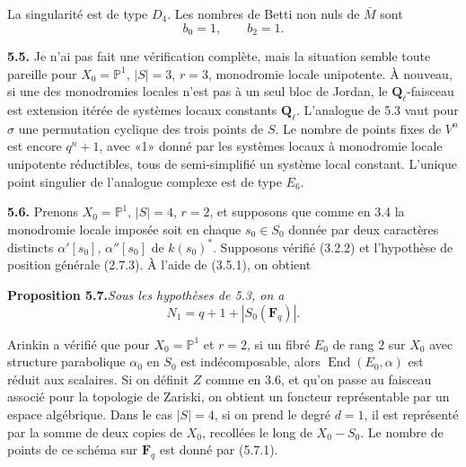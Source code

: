 \documentclass[11pt]{article}
\newcommand{\Fq}{\mathbf{F}_q}
\newcommand{\Ql}{\mathbf{Q}_{\ell}}
\newcommand{\End}{\operatorname{End}}
\newcommand{\Pone}{\mathbb{P}^{1}}
\newcommand{\para}[1]{\medskip\noindent\textbf{#1}\enspace}
\begin{document}
La singularité est de type \(D_4\). Les nombres de Betti non nuls de \(\bar M\) sont
\begin{equation}
  b_0=1,\qquad b_2=1.
\tag{5.4.1}
\end{equation}

\para{5.5.} Je n'ai pas fait une vérification complète, mais la situation semble toute pareille pour \(X_0=\Pone\), \(|S|=3\), \(r=3\), monodromie locale unipotente. À nouveau, si une des monodromies locales n'est pas à un seul bloc de Jordan, le \(\Ql\)-faisceau est extension itérée de systèmes locaux constants \(\Ql\). L'analogue de 5.3 vaut pour \(\sigma\) une permutation cyclique des trois points de \(S\). Le nombre de points fixes de \(V^n\) est encore \(q^n+1\), avec «1» donné par les systèmes locaux à monodromie locale unipotente réductibles, tous de semi-simplifié un système local constant. L'unique point singulier de l'analogue complexe est de type \(E_6\).

\para{5.6.} Prenons \(X_0=\Pone\), \(|S|=4\), \(r=2\), et supposons que comme en 3.4 la monodromie locale imposée soit en chaque \(s_0\in S_0\) donnée par deux caractères distincts \(\alpha'[s_0]\), \(\alpha''[s_0]\) de \(k(s_0)^*\). Supposons vérifié (3.2.2) et l'hypothèse de position générale (2.7.3). À l'aide de (3.5.1), on obtient

\noindent\textbf{Proposition 5.7.}\quad\textit{Sous les hypothèses de 5.3, on a}
\begin{equation}
  N_1=q+1+|S_0(\Fq)|.
\tag{5.7.1}
\end{equation}

Arinkin a vérifié que pour \(X_0=\Pone\) et \(r=2\), si un fibré \(E_0\) de rang \(2\) sur \(X_0\) avec structure parabolique \(\alpha_0\) en \(S_0\) est indécomposable, alors \(\End(E_0,\alpha)\) est réduit aux scalaires. Si on définit \(Z\) comme en 3.6, et qu'on passe au faisceau associé pour la topologie de Zariski, on obtient un foncteur représentable par un espace algébrique. Dans le cas \(|S|=4\), si on prend le degré \(d=1\), il est représenté par la somme de deux copies de \(X_0\), recollées le long de \(X_0-S_0\). Le nombre de points de ce schéma sur \(\Fq\) est donné par (5.7.1).
\end{document}
